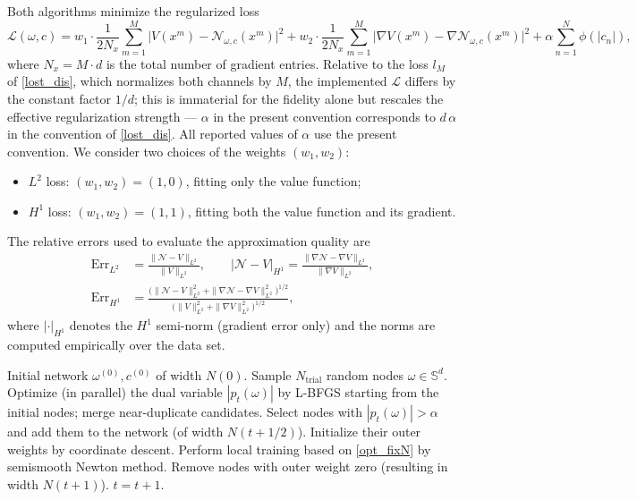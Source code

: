 \documentclass[11pt]{amsart}
\theoremstyle{definition}
\theoremstyle{remark}
\begin{document}
Both algorithms minimize the regularized loss
\begin{equation*}
	\mathcal{L}(\omega, c) = w_1 \cdot \frac{1}{2N_x} \sum_{m=1}^M \big| V(x^m) - \mathcal{N}_{\omega,c}(x^m) \big|^2
	+ w_2 \cdot \frac{1}{2N_x} \sum_{m=1}^M \big| \nabla V(x^m) - \nabla \mathcal{N}_{\omega,c}(x^m) \big|^2
	+ \alpha \sum_{n=1}^N \phi(|c_n|),
\end{equation*}
where $N_x = M \cdot d$ is the total number of gradient entries. Relative to the loss $l_M$ of \eqref{lost_dis}, which normalizes both channels by $M$, the implemented $\mathcal{L}$ differs by the constant factor $1/d$; this is immaterial for the fidelity alone but rescales the effective regularization strength --- $\alpha$ in the present convention corresponds to $d\,\alpha$ in the convention of \eqref{lost_dis}. All reported values of $\alpha$ use the present convention. We consider two choices of the weights $(w_1, w_2)$:
\begin{itemize}
	\item $L^2$ loss: $(w_1, w_2) = (1, 0)$, fitting only the value function;
	\item $H^1$ loss: $(w_1, w_2) = (1, 1)$, fitting both the value function and its gradient.
\end{itemize}
The relative errors used to evaluate the approximation quality are
\begin{align*}
	\mathrm{Err}_{L^2} &= \frac{\| \mathcal{N} - V \|_{L^2}}{\| V \|_{L^2}}, \qquad
	|\mathcal{N} - V|_{H^1} = \frac{\| \nabla \mathcal{N} - \nabla V \|_{L^2}}{\| \nabla V \|_{L^2}}, \\
	\mathrm{Err}_{H^1} &= \frac{\big(\| \mathcal{N} - V \|_{L^2}^2 + \| \nabla \mathcal{N} - \nabla V \|_{L^2}^2\big)^{1/2}}{\big(\| V \|_{L^2}^2 + \| \nabla V \|_{L^2}^2\big)^{1/2}},
\end{align*}
where $|\cdot|_{H^1}$ denotes the $H^1$ semi-norm (gradient error only) and the norms are computed empirically over the data set.

\begin{algorithm}[htbp]
\caption{Iterative node insertion and optimization with $\phi_{\gamma}$-penalty}
\label{alg:log}
\begin{algorithmic}[1]
\State Initial network $\omega^{(0)}, c^{(0)}$ of width $N(0)$.
\State Sample $N_{\mathrm{trial}}$ random nodes $\omega \in \mathbb{S}^d$.
\State Optimize (in parallel) the dual variable $|p_t(\omega)|$ by L-BFGS starting from the initial nodes; merge near-duplicate candidates.
\State Select nodes with $|p_t(\omega)| > \alpha$ and add them to the network (of width $N(t + 1/2)$). Initialize their outer weights by coordinate descent.
\State Perform local training based on \eqref{opt_fixN} by semismooth Newton method.
\State Remove nodes with outer weight zero (resulting in width $N(t+1)$).
\State $t = t + 1$.
\EndWhile
\end{algorithmic}
\end{algorithm}
\end{document}
